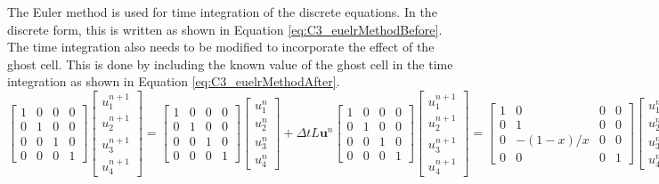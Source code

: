 The Euler method is used for time integration of the discrete equations. In the discrete form, this is written as shown in Equation \eqref{eq:C3_euelrMethodBefore}. The time integration also needs to be modified to incorporate the effect of the ghost cell. This is done by including the known value of the ghost cell in the time integration as shown in Equation \eqref{eq:C3_euelrMethodAfter}.
%
\begin{subequations}
\begin{equation}\label{eq:C3_euelrMethodBefore}
    \begin{bmatrix}
    1 & 0 & 0 & 0 \\
    0 & 1 & 0 & 0 \\
    0 & 0 & 1 & 0 \\
    0 & 0 & 0 & 1
    \end{bmatrix}
    \begin{bmatrix}
    u_1^{n+1} \\
    u_2^{n+1} \\
    u_3^{n+1} \\
    u_4^{n+1}
    \end{bmatrix}
    =
    \begin{bmatrix}
    1 & 0 & 0 & 0 \\
    0 & 1 & 0 & 0 \\
    0 & 0 & 1 & 0 \\
    0 & 0 & 0 & 1
    \end{bmatrix}
    \begin{bmatrix}
    u_1^{n} \\
    u_2^{n} \\
    u_3^{n} \\
    u_4^{n}
    \end{bmatrix}
    + 
    \Delta t L \mathbf{u}^n
\end{equation}
\begin{equation}\label{eq:C3_euelrMethodAfter}
    \begin{bmatrix}
    1 & 0 & 0 & 0 \\
    0 & 1 & 0 & 0 \\
    0 & 0 & 1 & 0 \\
    0 & 0 & 0 & 1
    \end{bmatrix}
    \begin{bmatrix}
    u_1^{n+1} \\
    u_2^{n+1} \\
    u_3^{n+1} \\
    u_4^{n+1}
    \end{bmatrix}
    =
    \begin{bmatrix}
    1 & 0 & 0 & 0 \\
    0 & 1 & 0 & 0 \\
    0 & -(1-x)/x & 0 & 0 \\
    0 & 0 & 0 & 1
    \end{bmatrix}
    \begin{bmatrix}
    u_1^{n} \\
    u_2^{n} \\
    u_3^{n} \\
    u_4^{n}
    \end{bmatrix}
    + 
    \Delta t L' \mathbf{u}^n
\end{equation}
\end{subequations}
